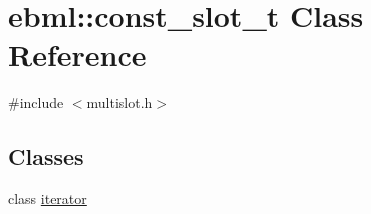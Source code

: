 \hypertarget{classebml_1_1const__slot__t}{}\section{ebml\+:\+:const\+\_\+slot\+\_\+t Class Reference}
\label{classebml_1_1const__slot__t}


{\ttfamily \#include $<$multislot.\+h$>$}

\subsection*{Classes}
\begin{DoxyCompactItemize}
\item 
class \mbox{\hyperlink{classebml_1_1const__slot__t_1_1iterator}{iterator}}
\end{DoxyCompactItemize}

